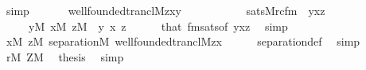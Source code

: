 \begin{isabellebody}
\ simp\isanewline
\ \ \isamarkupfalse%
\isanewline
\ \ \isamarkupfalse%
\ {\isachardoublequoteopen}{\isacharparenleft}{\kern0pt}wellfounded{\isacharunderscore}{\kern0pt}trancl{\isacharparenleft}{\kern0pt}{\isacharhash}{\kern0pt}{\isacharhash}{\kern0pt}M{\isacharcomma}{\kern0pt}z{\isacharcomma}{\kern0pt}x{\isacharcomma}{\kern0pt}y{\isacharparenright}{\kern0pt}{\isacharparenright}{\kern0pt}\isanewline
\ \ \ \ \ \ \ \ \ \ {\isasymlongleftrightarrow}\ sats{\isacharparenleft}{\kern0pt}M{\isacharcomma}{\kern0pt}rcfm{\isacharparenleft}{\kern0pt}{}{\isacharcomma}{\kern0pt}{}{\isacharcomma}{\kern0pt}{}{\isacharparenright}{\kern0pt}\ {\isacharcomma}{\kern0pt}\ {\isacharbrackleft}{\kern0pt}y{\isacharcomma}{\kern0pt}x{\isacharcomma}{\kern0pt}z{\isacharbrackright}{\kern0pt}{\isacharparenright}{\kern0pt}{\isachardoublequoteclose}\isanewline
\ \ \ \ \ {\isachardoublequoteopen}y{\isasymin}M{\isachardoublequoteclose}\ {\isachardoublequoteopen}x{\isasymin}M{\isachardoublequoteclose}\ {\isachardoublequoteopen}z{\isasymin}M{\isachardoublequoteclose}\ \ y\ x\ z\isanewline
\ \ \ \ \isamarkupfalse%
\ that\ fmsats{\isacharbrackleft}{\kern0pt}of\ {\isachardoublequoteopen}{\isacharbrackleft}{\kern0pt}y{\isacharcomma}{\kern0pt}x{\isacharcomma}{\kern0pt}z{\isacharbrackright}{\kern0pt}{\isachardoublequoteclose}{\isacharbrackright}{\kern0pt}\ \isamarkupfalse%
\ simp\isanewline
\ \ \isamarkupfalse%
\isanewline
\ \ \isamarkupfalse%
\ {\isachardoublequoteopen}{\isasymforall}x{\isasymin}M{\isachardot}{\kern0pt}\ {\isasymforall}z{\isasymin}M{\isachardot}{\kern0pt}\ separation{\isacharparenleft}{\kern0pt}{\isacharhash}{\kern0pt}{\isacharhash}{\kern0pt}M{\isacharcomma}{\kern0pt}\ wellfounded{\isacharunderscore}{\kern0pt}trancl{\isacharparenleft}{\kern0pt}{\isacharhash}{\kern0pt}{\isacharhash}{\kern0pt}M{\isacharcomma}{\kern0pt}z{\isacharcomma}{\kern0pt}x{\isacharparenright}{\kern0pt}{\isacharparenright}{\kern0pt}{\isachardoublequoteclose}\isanewline
\ \ \ \ \isamarkupfalse%
\ separation{\isacharunderscore}{\kern0pt}def\ \isamarkupfalse%
\ simp\isanewline
\ \ \isamarkupfalse%
\ {\isacartoucheopen}r{\isasymin}M{\isacartoucheclose}\ {\isacartoucheopen}Z{\isasymin}M{\isacartoucheclose}\ \isamarkupfalse%
\ {\isacharquery}{\kern0pt}thesis\ \isamarkupfalse%
\ simp\isanewline
{}\isamarkupfalse%
%
\endisatagproof
{\isafoldproof}%

\end{isabellebody}
